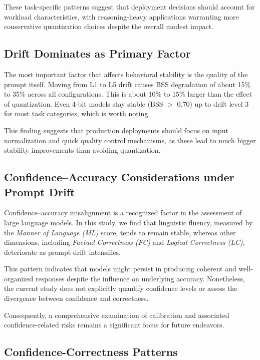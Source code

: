 \documentclass[conference]{IEEEtran}
\begin{document}
{\begin{itemize}
\end{itemize}

These task-specific patterns suggest that deployment decisions should account for workload characteristics, with reasoning-heavy applications warranting more conservative quantization choices despite the overall modest impact.

\subsection{Drift Dominates as Primary Factor}

The most important factor that affects behavioral stability is the quality of the prompt itself. Moving from L1 to L5 drift causes BSS degradation of about 15\% to 35\% across all configurations. This is about 10\% to 15\% larger than the effect of quantization. Even 4-bit models stay stable (BSS $>$ 0.70) up to drift level 3 for most task categories, which is worth noting.

This finding suggests that production deployments should focus on input normalization and quick quality control mechanisms, as these lead to much bigger stability improvements than avoiding quantization.


\subsection{Confidence–Accuracy Considerations under Prompt Drift}

Confidence–accuracy misalignment is a recognized factor in the assessment of large language models. In this study, we find that linguistic fluency, measured by the \textit{Manner of Language (ML)} score, tends to remain stable, whereas other dimensions, including \textit{Factual Correctness (FC)} and \textit{Logical Correctness (LC)}, deteriorate as prompt drift intensifies.

This pattern indicates that models might persist in producing coherent and well-organized responses despite the influence on underlying accuracy. Nonetheless, the current study does not explicitly quantify confidence levels or assess the divergence between confidence and correctness.

Consequently, a comprehensive examination of calibration and associated confidence-related risks remains a significant focus for future endeavors.


\subsection{Confidence-Correctness Patterns}

}
\end{document}
